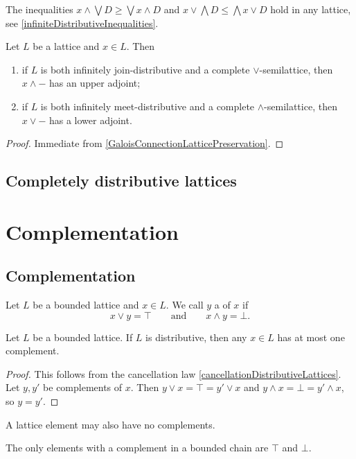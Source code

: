 The inequalities $x\wedge \bigvee D \geq \bigvee x\wedge D$ and $x\vee \bigwedge D \leq \bigwedge x\vee D$ hold in any lattice, see \ref{infiniteDistributiveInequalities}.

\begin{lemma}
Let $L$ be a lattice and $x\in L$. Then
\begin{enumerate}
\item if $L$ is both infinitely join-distributive and a complete $\vee$-semilattice, then $x\wedge -$ has an upper adjoint;
\item if $L$ is both infinitely meet-distributive and a complete $\wedge$-semilattice, then $x\vee -$ has a  lower adjoint.
\end{enumerate}
\end{lemma}
\begin{proof}
Immediate from \ref{GaloisConnectionLatticePreservation}.
\end{proof}

\subsection{Completely distributive lattices}

\section{Complementation}
\subsection{Complementation}
\begin{definition}
Let $L$ be a bounded lattice and $x\in L$. We call $y$ a  of $x$ if
\[ x \vee y = \top \qquad \text{and} \qquad x\wedge y = \bot. \]
\end{definition}

\begin{proposition} \label{distributiveComplementUnique}
Let $L$ be a bounded lattice. If $L$ is distributive, then any $x\in L$ has at most one complement.
\end{proposition}
\begin{proof}
This follows from the cancellation law \ref{cancellationDistributiveLattices}. Let $y,y'$ be complements of $x$. Then $y\vee x = \top = y'\vee x$ and $y\wedge x = \bot = y'\wedge x$, so $y=y'$.
\end{proof}

A lattice element may also have no complements.
\begin{example}
The only elements with a complement in a bounded chain are $\top$ and $\bot$.
\end{example}

